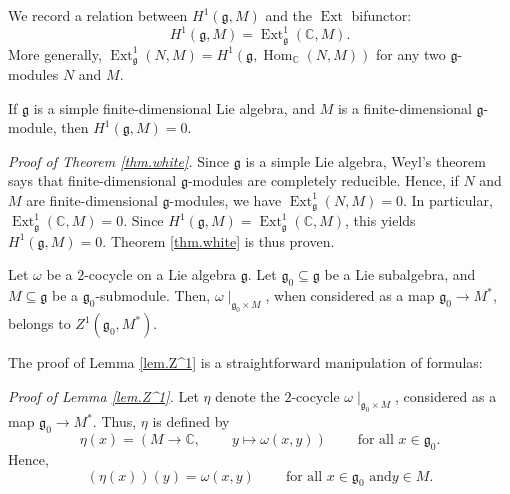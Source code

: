 \documentclass[etingof-lie.tex]{subfiles}
\begin{document}
\begin{definition}
We record a relation between $H^{1}\left(  \mathfrak{g},M\right)  $ and the
$\operatorname*{Ext}$ bifunctor:%
\[
H^{1}\left(  \mathfrak{g},M\right)  =\operatorname*{Ext}%
\nolimits_{\mathfrak{g}}^{1}\left(  \mathbb{C},M\right)  .
\]
More generally, $\operatorname*{Ext}\nolimits_{\mathfrak{g}}^{1}\left(
N,M\right)  =H^{1}\left(  \mathfrak{g},\operatorname*{Hom}%
\nolimits_{\mathbb{C}}\left(  N,M\right)  \right)  $ for any two
$\mathfrak{g}$-modules $N$ and $M$.
\end{definition}

\begin{theorem}
[Whitehead]\label{thm.white}If $\mathfrak{g}$ is a simple finite-dimensional
Lie algebra, and $M$ is a finite-dimensional $\mathfrak{g}$-module, then
$H^{1}\left(  \mathfrak{g},M\right)  =0$.
\end{theorem}

\textit{Proof of Theorem \ref{thm.white}.} Since $\mathfrak{g}$ is a simple
Lie algebra, Weyl's theorem says that finite-dimensional $\mathfrak{g}%
$-modules are completely reducible. Hence, if $N$ and $M$ are
finite-dimensional $\mathfrak{g}$-modules, we have $\operatorname*{Ext}%
\nolimits_{\mathfrak{g}}^{1}\left(  N,M\right)  =0$. In particular,
$\operatorname*{Ext}\nolimits_{\mathfrak{g}}^{1}\left(  \mathbb{C},M\right)
=0$. Since $H^{1}\left(  \mathfrak{g},M\right)  =\operatorname*{Ext}%
\nolimits_{\mathfrak{g}}^{1}\left(  \mathbb{C},M\right)  $, this yields
$H^{1}\left(  \mathfrak{g},M\right)  =0$. Theorem \ref{thm.white} is thus proven.

\begin{lemma}
\label{lem.Z^1}Let $\omega$ be a $2$-cocycle on a Lie algebra $\mathfrak{g}$.
Let $\mathfrak{g}_{0}\subseteq\mathfrak{g}$ be a Lie subalgebra, and
$M\subseteq\mathfrak{g}$ be a $\mathfrak{g}_{0}$-submodule. Then, $\omega
\mid_{\mathfrak{g}_{0}\times M}$, when considered as a map $\mathfrak{g}%
_{0}\rightarrow M^{\ast}$, belongs to $Z^{1}\left(  \mathfrak{g}_{0},M^{\ast
}\right)  $.
\end{lemma}

The proof of Lemma \ref{lem.Z^1} is a straightforward manipulation of formulas:

\textit{Proof of Lemma \ref{lem.Z^1}.} Let $\eta$ denote the $2$-cocycle
$\omega\mid_{\mathfrak{g}_{0}\times M}$, considered as a map $\mathfrak{g}%
_{0}\rightarrow M^{\ast}$. Thus, $\eta$ is defined by%
\[
\eta\left(  x\right)  =\left(  M\rightarrow\mathbb{C}%
,\ \ \ \ \ \ \ \ \ \ y\mapsto\omega\left(  x,y\right)  \right)
\ \ \ \ \ \ \ \ \ \ \text{for all }x\in\mathfrak{g}_{0}.
\]
Hence,
\begin{equation}
\left(  \eta\left(  x\right)  \right)  \left(  y\right)  =\omega\left(
x,y\right)  \ \ \ \ \ \ \ \ \ \ \text{for all }x\in\mathfrak{g}_{0}\text{ and
}y\in M. \label{pf.Z^1.eta}%
\end{equation}
\end{document}
